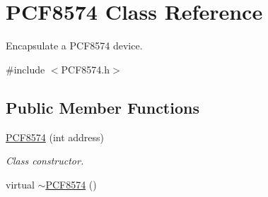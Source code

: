 \hypertarget{class_p_c_f8574}{}\section{P\+C\+F8574 Class Reference}
\label{class_p_c_f8574}


Encapsulate a P\+C\+F8574 device.  




{\ttfamily \#include $<$P\+C\+F8574.\+h$>$}

\subsection*{Public Member Functions}
\begin{DoxyCompactItemize}
\item 
\hyperlink{class_p_c_f8574_aeaba161d7932ea2aa7f3bb9d05d36fba}{P\+C\+F8574} (int address)
\begin{DoxyCompactList}\small\item\em Class constructor. \end{DoxyCompactList}\item 
virtual \hyperlink{class_p_c_f8574_a20ddebfc28ba46646ca84f8c75034b34}{$\sim$\+P\+C\+F8574} ()\hypertarget{class_p_c_f8574_a20ddebfc28ba46646ca84f8c75034b34}{}\label{class_p_c_f8574_a20ddebfc28ba46646ca84f8c75034b34}


\end{DoxyCompactItemize}
